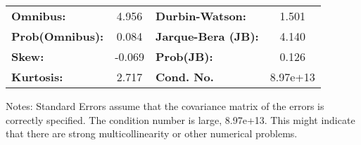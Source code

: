 \begin{center}
\begin{tabular}{lcccccc}
\bottomrule
\end{tabular}
\begin{tabular}{lclc}
\textbf{Omnibus:}       &  4.956 & \textbf{  Durbin-Watson:     } &    1.501  \\
\textbf{Prob(Omnibus):} &  0.084 & \textbf{  Jarque-Bera (JB):  } &    4.140  \\
\textbf{Skew:}          & -0.069 & \textbf{  Prob(JB):          } &    0.126  \\
\textbf{Kurtosis:}      &  2.717 & \textbf{  Cond. No.          } & 8.97e+13  \\
\bottomrule
\end{tabular}
\end{center}

Notes: \newline
 [1] Standard Errors assume that the covariance matrix of the errors is correctly specified. \newline
 [2] The condition number is large, 8.97e+13. This might indicate that there are \newline
 strong multicollinearity or other numerical problems.